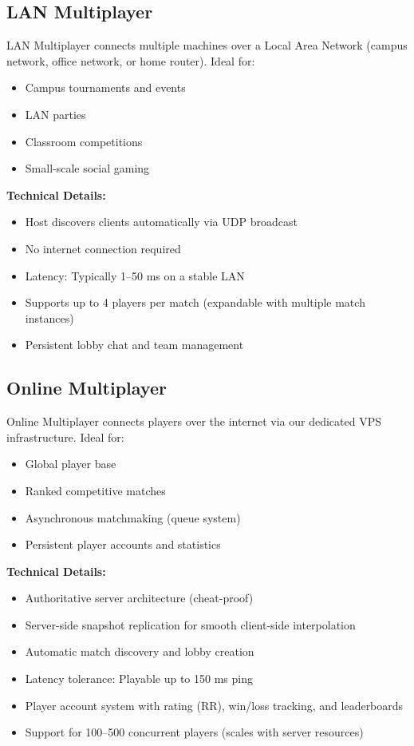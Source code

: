 \documentclass[12pt,a4paper]{article}
\begin{document}
\subsection{LAN Multiplayer}

LAN Multiplayer connects multiple machines over a Local Area Network (campus network, office network, or home router). Ideal for:
\begin{itemize}
    \item Campus tournaments and events
    \item LAN parties
    \item Classroom competitions
    \item Small-scale social gaming
\end{itemize}

\textbf{Technical Details:}
\begin{itemize}
    \item Host discovers clients automatically via UDP broadcast
    \item No internet connection required
    \item Latency: Typically 1–50 ms on a stable LAN
    \item Supports up to 4 players per match (expandable with multiple match instances)
    \item Persistent lobby chat and team management
\end{itemize}

\subsection{Online Multiplayer}

Online Multiplayer connects players over the internet via our dedicated VPS infrastructure. Ideal for:
\begin{itemize}
    \item Global player base
    \item Ranked competitive matches
    \item Asynchronous matchmaking (queue system)
    \item Persistent player accounts and statistics
\end{itemize}

\textbf{Technical Details:}
\begin{itemize}
    \item Authoritative server architecture (cheat-proof)
    \item Server-side snapshot replication for smooth client-side interpolation
    \item Automatic match discovery and lobby creation
    \item Latency tolerance: Playable up to 150 ms ping
    \item Player account system with rating (RR), win/loss tracking, and leaderboards
    \item Support for 100–500 concurrent players (scales with server resources)
\end{itemize}
\end{document}
